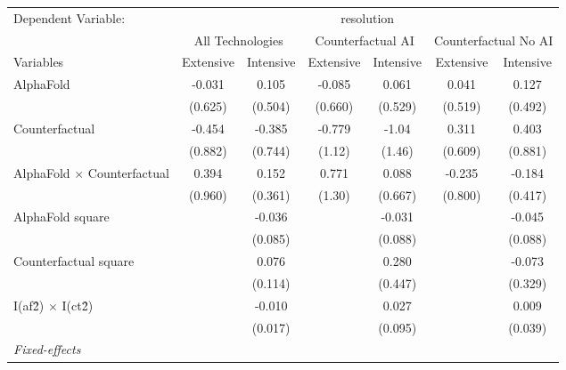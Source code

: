 \begingroup
\centering
\begin{tabular}{lcccccc}
   \tabularnewline \midrule \midrule
   Dependent Variable: & \multicolumn{6}{c}{resolution}\\
 & \multicolumn{2}{c}{All Technologies} & \multicolumn{2}{c}{Counterfactual AI} & \multicolumn{2}{c}{Counterfactual No AI} \\
\cmidrule(lr){1-1}\cmidrule(lr){2-3} \cmidrule(lr){4-5} \cmidrule(lr){6-7}
Variables & \multicolumn{1}{c}{Extensive} & \multicolumn{1}{c}{Intensive} & \multicolumn{1}{c}{Extensive} & \multicolumn{1}{c}{Intensive} & \multicolumn{1}{c}{Extensive} & \multicolumn{1}{c}{Intensive} \\
\cmidrule(lr){1-1}\cmidrule(lr){2-2} \cmidrule(lr){3-3} \cmidrule(lr){4-4} \cmidrule(lr){5-5} \cmidrule(lr){6-6} \cmidrule(lr){7-7}
   AlphaFold                          & -0.031  & 0.105   & -0.085  & 0.061   & 0.041   & 0.127\\   
                                      & (0.625) & (0.504) & (0.660) & (0.529) & (0.519) & (0.492)\\   
   Counterfactual                     & -0.454  & -0.385  & -0.779  & -1.04   & 0.311   & 0.403\\   
                                      & (0.882) & (0.744) & (1.12)  & (1.46)  & (0.609) & (0.881)\\   
   AlphaFold $\times$ Counterfactual  & 0.394   & 0.152   & 0.771   & 0.088   & -0.235  & -0.184\\   
                                      & (0.960) & (0.361) & (1.30)  & (0.667) & (0.800) & (0.417)\\   
   AlphaFold square                   &         & -0.036  &         & -0.031  &         & -0.045\\   
                                      &         & (0.085) &         & (0.088) &         & (0.088)\\   
   Counterfactual square              &         & 0.076   &         & 0.280   &         & -0.073\\   
                                      &         & (0.114) &         & (0.447) &         & (0.329)\\   
   I(af\^2) $\times$ I(ct\^2)         &         & -0.010  &         & 0.027   &         & 0.009\\   
                                      &         & (0.017) &         & (0.095) &         & (0.039)\\   
   \midrule
   \emph{Fixed-effects}\\

\end{tabular}

